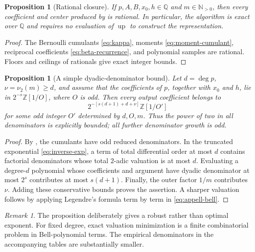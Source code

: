 \documentclass[11pt,oneside]{article}
\newtheorem{proposition}[theorem]{Proposition}
\theoremstyle{definition}
\theoremstyle{remark}
\newtheorem{remark}[theorem]{Remark}
\newcommand{\Q}{\mathbb Q}
\newcommand{\N}{\mathbb N}
\newcommand{\Z}{\mathbb Z}
\newcommand{\Up}{\operatorname{up}}
\newcommand{\vtwo}{\nu_2}
\begin{document}
\begin{proposition}[Rational closure]
\label{prop:rationality}
If \(p,A,B,x_0,h\in\Q\) and \(m\in\N_{>0}\), then every coefficient and
center produced by  is rational.  In particular, the algorithm
is exact over \(\Q\) and requires no evaluation of \(\Up\) to construct the
representation.
\end{proposition}

\begin{proof}
The Bernoulli cumulants \eqref{eq:kappa}, moments
\eqref{eq:moment-cumulant}, reciprocal coefficients
\eqref{eq:beta-recurrence}, and polynomial samples are rational.  Floors and
ceilings of rationals give exact integer bounds.
\end{proof}

\begin{proposition}[A simple dyadic-denominator bound]
\label{prop:dyadic-denominator}
Let \(d=\deg p\), \(\nu=\vtwo(m)\ge d\), and assume that the coefficients
of \(p\), together with \(x_0\) and \(h\), lie in
\(2^{-s}\Z[1/O]\), where \(O\) is odd.  Then every output coefficient belongs
to
\[
 2^{-[s(d+1)+d+\nu]}\Z[1/O']
\]
for some odd integer \(O'\) determined by \(d,O,m\).  Thus the power of two
in all denominators is explicitly bounded; all further denominator growth is
odd.
\end{proposition}

\begin{proof}
By , the cumulants have odd reduced denominators.
In the truncated exponential \eqref{eq:inverse-exp}, a term of total
differential order at most \(d\) contains factorial denominators whose total
\(2\)-adic valuation is at most \(d\).  Evaluating a degree-\(d\) polynomial
whose coefficients and argument have dyadic denominator at most \(2^s\)
contributes at most \(s(d+1)\).  Finally, the outer factor \(1/m\) contributes
\(\nu\).  Adding these conservative bounds proves the assertion.  A sharper
valuation follows by applying Legendre's formula term by term in
\eqref{eq:appell-bell}.
\end{proof}

\begin{remark}
The proposition deliberately gives a robust rather than optimal exponent.
For fixed degree, exact valuation minimization is a finite combinatorial
problem in Bell-polynomial terms.  The empirical denominators in the
accompanying tables are substantially smaller.
\end{remark}
\end{document}
